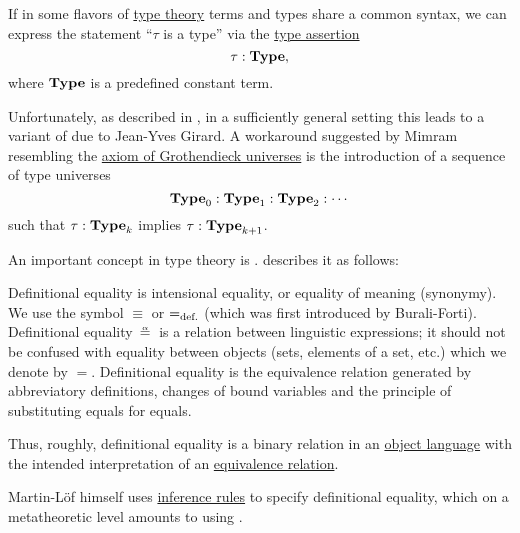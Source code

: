 \begin{remark}\label{rem:type_universes}
  If in some flavors of \hyperref[rem:type_theory]{type theory} terms and types share a common syntax, we can express the statement \enquote{\( \tau \) is a type} via the \hyperref[def:type_assertion]{type assertion}
  \begin{equation*}
    \tau: \op*{Type},
  \end{equation*}
  where \( \op*{Type} \) is a predefined constant term.

  Unfortunately, as described in , in a sufficiently general setting this leads to a variant of  due to Jean-Yves Girard. A workaround suggested by Mimram resembling the \hyperref[def:axiom_of_universes]{axiom of Grothendieck universes} is the introduction of a sequence of type universes
  \begin{equation*}
    \op*{Type}_0: \op*{Type}_1: \op*{Type}_2: \cdots
  \end{equation*}
  such that \( \tau: \op*{Type}_k \) implies \( \tau: \op*{Type}_{k+1} \).
\end{remark}

\begin{definition}\label{con:definitional_equality}
  An important concept in type theory is .  describes it as follows:
  \begin{displayquote}
    Definitional equality is intensional equality, or equality of meaning (synonymy). We use the symbol \( {\equiv} \) or \( {=_{\T{def.}}} \) (which was first introduced by Burali-Forti). Definitional equality \( {\aequiv} \) is a relation between linguistic expressions; it should not be confused with equality between objects (sets, elements of a set, etc.) which we denote by \( {=} \). Definitional equality is the equivalence relation generated by abbreviatory definitions, changes of bound variables and the principle of substituting equals for equals.
  \end{displayquote}

  Thus, roughly, definitional equality is a binary relation in an \hyperref[con:metalogic]{object language} with the intended interpretation of an \hyperref[def:equivalence_relation]{equivalence relation}.

  Martin-L\"of himself uses \hyperref[def:inference_rule]{inference rules} to specify definitional equality, which on a metatheoretic level amounts to using .
\end{definition}


